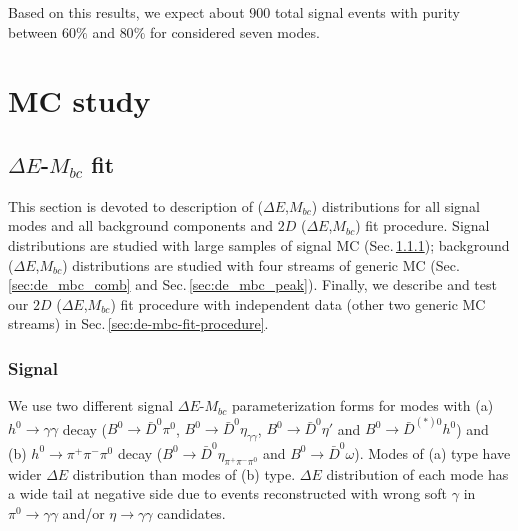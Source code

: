 \documentclass[preprint,aps,showpacs]{revtex4}
\newcommand{\bdsth}{\ensuremath{B^0\to \bar D^{(*)0}h^0}\xspace}
\newcommand{\bdpi}{\ensuremath{B^0\to \bar D^0\pi^0}\xspace}
\newcommand{\bdetagg}{\ensuremath{B^0\to \bar D^0\eta_{\gamma\gamma}}\xspace}
\newcommand{\bdetap}{\ensuremath{B^0\to \bar D^0\eta\prime}\xspace}
\newcommand{\bdetappp}{\ensuremath{B^0\to \bar D^0\eta_{\pi^+\pi^-\pi^0}}\xspace}
\newcommand{\bdomega}{\ensuremath{B^0\to \bar D^0\omega}\xspace}
\newcommand{\hgg}{\ensuremath{h^0\to\gamma\gamma}\xspace}
\newcommand{\etagg}{\ensuremath{\eta\to\gamma\gamma}\xspace}
\newcommand{\hppp}{\ensuremath{h^0\to\pi^+\pi^-\pi^0}\xspace}
\newcommand{\de}{\ensuremath{\Delta E}\xspace}
\newcommand{\mbc}{\ensuremath{M_{bc}}\xspace}
\begin{document}
 Based on this results, we expect about $900$ total signal events with purity between $60\%$ and $80\%$ for considered seven modes.

\newpage
\section{MC study}
\subsection{\de-\mbc fit}
This section is devoted to description of (\de,\mbc) distributions for all signal modes and all background components and $2D$ (\de,\mbc) fit procedure. Signal distributions are studied with large samples of signal MC (Sec.\,\ref{sec:de_mbc_signal}); background (\de,\mbc) distributions are studied with four streams of generic MC (Sec.\,\ref{sec:de_mbc_comb} and Sec.\,\ref{sec:de_mbc_peak}). Finally, we describe and test our $2D$ (\de,\mbc) fit procedure with independent data (other two generic MC streams) in Sec.\,\ref{sec:de-mbc-fit-procedure}.

\subsubsection{Signal}\label{sec:de_mbc_signal}
We use two different signal \de-\mbc parameterization forms for modes with (a) \hgg decay (\bdpi, \bdetagg, \bdetap and \bdsth) and (b) \hppp decay (\bdetappp and \bdomega). Modes of (a) type have wider \de distribution than modes of (b) type. \de distribution of each mode has a wide tail at negative side due to events reconstructed with wrong soft $\gamma$ in $\pi^0\to\gamma\gamma$ and/or \etagg candidates. %
\end{document}
